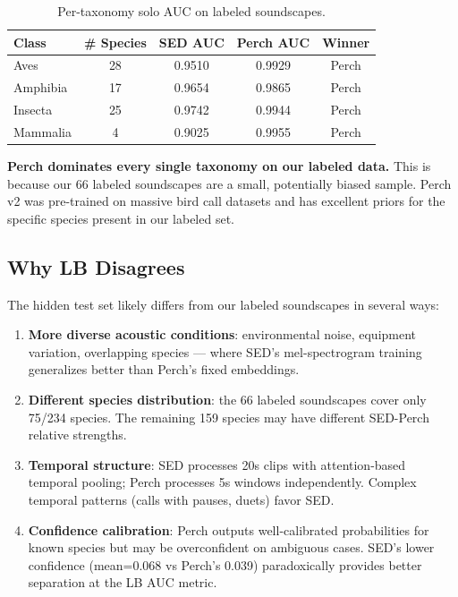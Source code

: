 \documentclass[a4paper,11pt]{article}
\begin{document}
\begin{table}[h]
\centering
\caption{Per-taxonomy solo AUC on labeled soundscapes.}
\begin{tabular}{lcccc}
\toprule
Class & \# Species & SED AUC & Perch AUC & Winner \\
\midrule
Aves & 28 & 0.9510 & 0.9929 & Perch \\
Amphibia & 17 & 0.9654 & 0.9865 & Perch \\
Insecta & 25 & 0.9742 & 0.9944 & Perch \\
Mammalia & 4 & 0.9025 & 0.9955 & Perch \\
\bottomrule
\end{tabular}
\label{tab:taxonomy}
\end{table}

\textbf{Perch dominates every single taxonomy on our labeled data.}
This is because our 66 labeled soundscapes are a small, potentially biased sample.
Perch v2 was pre-trained on massive bird call datasets and has excellent priors for the specific species present in our labeled set.

\subsection{Why LB Disagrees}

The hidden test set likely differs from our labeled soundscapes in several ways:
\begin{enumerate}
\item \textbf{More diverse acoustic conditions}: environmental noise, equipment variation, overlapping species --- where SED's mel-spectrogram training generalizes better than Perch's fixed embeddings.
\item \textbf{Different species distribution}: the 66 labeled soundscapes cover only 75/234 species. The remaining 159 species may have different SED-Perch relative strengths.
\item \textbf{Temporal structure}: SED processes 20s clips with attention-based temporal pooling; Perch processes 5s windows independently. Complex temporal patterns (calls with pauses, duets) favor SED.
\item \textbf{Confidence calibration}: Perch outputs well-calibrated probabilities for known species but may be overconfident on ambiguous cases. SED's lower confidence (mean=0.068 vs Perch's 0.039) paradoxically provides better separation at the LB AUC metric.
\end{enumerate}
\end{document}

